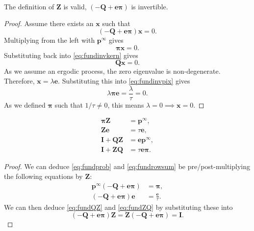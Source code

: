 \documentclass[12pt]{article}
\newcommand{\I}{\mathbf{I}}
\newcommand{\onev}{\mathbf{e}}
\newcommand{\MM}{\mathbf{Q}}
\newcommand{\eq}{\mathbf{p}^\infty}
\newcommand{\fund}{\mathbf{Z}}
\newcommand{\pib}{\boldsymbol{\pi}}
\begin{document}
\begin{thm}
  The definition of $\fund$ is valid, \ie $(-\MM + \onev\pib)$ is invertible.
\end{thm}
\begin{proof}
  Assume there exists an $\mathbf{x}$ such that
  \begin{equation}\label{eq:fundinvkern}
    (-\MM + \onev\pib)\mathbf{x}=0.
  \end{equation}
  Multiplying from the left with $\eq$ gives
  \begin{equation}\label{eq:fundinvpix}
    \pib \mathbf{x} = 0.
  \end{equation}
  Substituting back into \eqref{eq:fundinvkern} gives
  \begin{equation*}
    \MM\mathbf{x}=0.
  \end{equation*}
  As we assume an ergodic process, the zero eigenvalue is non-degenerate.
  Therefore, $\mathbf{x}=\lambda\onev$.
  Substituting this into \eqref{eq:fundinvpix} gives
  \begin{equation*}
    \lambda\pib\onev = \frac{\lambda}{\tau} = 0.
  \end{equation*}
  As we defined $\pib$ such that $1/\tau\neq0$, this means $\lambda=0 \implies \mathbf{x}=0$.
\end{proof}

\begin{cor}
  \begin{align}
    \pib\fund &= \eq, \label{eq:fundprob}\\
    \fund\onev &= \tau\onev,\label{eq:fundrowsum}\\
    \I+\MM\fund &= \onev\eq, \label{eq:fundQZ}\\
    \I+\fund\MM &= \tau\onev\pib. \label{eq:fundZQ}
  \end{align}
\end{cor}
\begin{proof}
  We can deduce \eqref{eq:fundprob} and \eqref{eq:fundrowsum} be pre/post-multiplying the following equations by $\fund$:
  \begin{equation*}
    \begin{aligned}
      \eq(-\MM + \onev\pib) &= \pib, \\
      (-\MM + \onev\pib)\onev &= \frac{\onev}{\tau}.
    \end{aligned}
  \end{equation*}
  We can then deduce \eqref{eq:fundQZ} and \eqref{eq:fundZQ} by substituting these into
  \begin{equation*}
    (-\MM + \onev\pib)\fund = \fund(-\MM + \onev\pib) = \I.
  \end{equation*}
\end{proof}
\end{document}
